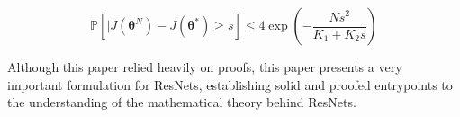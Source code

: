 $$\mathbb{P}[|J(\bm{\theta}^N) - J(\bm{\theta}^*) \geq s] \leq 4 \exp\left( - \frac{Ns^2}{K_1 + K_2 s}\right)$$


Although this paper relied heavily on proofs, this paper presents a very important formulation for ResNets, establishing solid and proofed entrypoints to the understanding of the mathematical theory behind ResNets.
